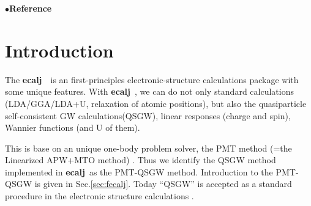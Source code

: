 \documentclass[a4paper,10pt,epsf,fleqn]{article}
\newcommand{\ecalj}{{\bf ecalj}\ }
\begin{document}
\tableofcontents
\vspace{5mm}
\noindent$\bullet${\bf Reference}



\newpage


%

%
\newpage
\section{Introduction}
The \ecalj\ is an first-principles electronic-structure 
calculations package with some unique features.
With \ecalj, we can do not only standard calculations
(LDA/GGA/LDA+U, relaxation of atomic positions), but also 
the quasiparticle self-consistent GW calculations(QSGW),
linear responses (charge and spin), Wannier functions (and U of them).

This is base on an unique one-body problem solver, the PMT method 
(=the Linearized APW+MTO method) \cite{kotani2015pmt}.
Thus we identify the QSGW method implemented in \ecalj as the PMT-QSGW method.
Introduction to the PMT-QSGW is given in Sec.\ref{sec:fecalj}. 
Today ``QSGW'' is accepted as a standard procedure in the electronic
structure calculations \cite{di_valentin_quasiparticle_2014}.



\end{document}
